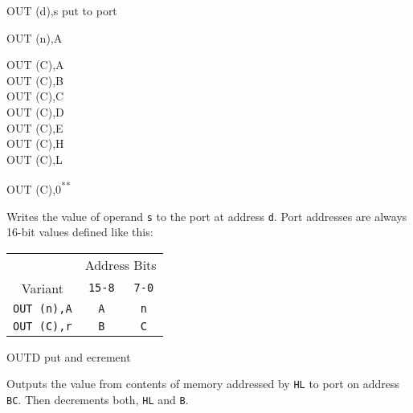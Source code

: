\documentclass[12pt,twoside,openright,a4paper]{book}
\newcommand{\UNDOC}{\textnormal{\textsuperscript{**}}}
\begin{document}
\begin{basedescript}{
	\desclabelstyle{\multilinelabel}
	\desclabelwidth{3cm}}
	\pagebreak
	\begin{DetailItem}{OUT (d),s}
		{put to port}
		{}

		\begin{DetailVariants}
			OUT (n),A
			
			\columnbreak
			OUT (C),A\\
			OUT (C),B\\
			OUT (C),C\\
			OUT (C),D\\
			OUT (C),E\\
			OUT (C),H\\
			OUT (C),L

			\columnbreak
			OUT (C),0\UNDOC
		\end{DetailVariants}

		Writes the value of operand {\tt s} to the port at address {\tt d}. Port addresses are always 16-bit values defined like this:

		\begin{tabular}{ccc}
			& \multicolumn{2}{c}{Address Bits} \\
			Variant & {\tt 15-8} & {\tt 7-0} \\
			\hline
			{\tt OUT (n),A} & {\tt A} & {\tt n} \\
			{\tt OUT (C),r} & {\tt B} & {\tt C} \\
		\end{tabular}
		\vspace{1ex} %

		\DetailNoEffect
				
		\begin{DetailTiming}
		\end{DetailTiming}


	\end{DetailItem}

	\label{DetailRefOUTD}
	\begin{DetailItem}{OUTD}
		{put and ecrement}
		{\SymOUTD}

		Outputs the value from contents of memory addressed by {\tt HL} to port on address {\tt BC}. Then decrements both, {\tt HL} and {\tt B}.


\end{DetailItem}
\end{basedescript}
\end{document}
